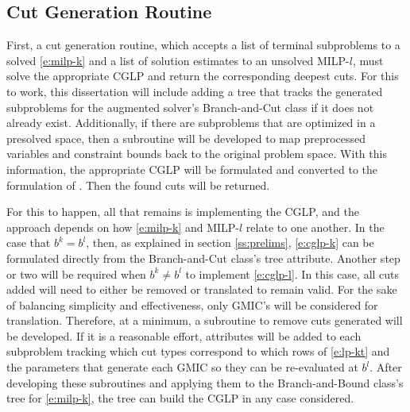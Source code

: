 \documentclass[10pt]{article}
\begin{document}
	\subsection{Cut Generation Routine} \label{ss:cut_generation}
	First, a cut generation routine, which accepts a list of terminal subproblems to a solved \ref{e:milp-k} and a list of solution estimates to an unsolved MILP-$ l $, must solve the appropriate CGLP and return the corresponding deepest cuts. For this to work, this dissertation will include adding a tree that tracks the generated subproblems for the augmented solver's Branch-and-Cut class if it does not already exist. Additionally, if there are subproblems that are optimized in a presolved space, then a subroutine will be developed to map preprocessed variables and constraint bounds back to the original problem space. With this information, the appropriate CGLP will be formulated and converted to the formulation of \cite{aleks}. Then the found cuts will be returned.
	
	For this to happen, all that remains is implementing the CGLP, and the approach depends on how \ref{e:milp-k} and MILP-$ l $ relate to one another. In the case that $ b^k = b^l $, then, as explained in section \ref{ss:prelims}, \ref{e:cglp-k} can be formulated directly from the Branch-and-Cut class's tree attribute. Another step or two will be required when $ b^k \neq b^l $ to implement \ref{e:cglp-l}. In this case, all cuts added will need to either be removed or translated to remain valid. For the sake of balancing simplicity and effectiveness, only GMIC's will be considered for translation. Therefore, at a minimum, a subroutine to remove cuts generated will be developed. If it is a reasonable effort, attributes will be added to each subproblem tracking which cut types correspond to which rows of \ref{e:lp-kt} and the parameters that generate each GMIC so they can be re-evaluated at $ b^l $. After developing these subroutines and applying them to the Branch-and-Bound class's tree for \ref{e:milp-k}, the tree can build the CGLP in any case considered.
	
\end{document}
